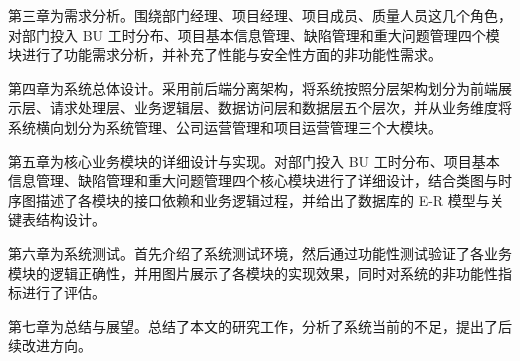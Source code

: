 第三章为需求分析。围绕部门经理、项目经理、项目成员、质量人员这几个角色，对部门投入 BU 工时分布、项目基本信息管理、缺陷管理和重大问题管理四个模块进行了功能需求分析，并补充了性能与安全性方面的非功能性需求。

第四章为系统总体设计。采用前后端分离架构，将系统按照分层架构划分为前端展示层、请求处理层、业务逻辑层、数据访问层和数据层五个层次，并从业务维度将系统横向划分为系统管理、公司运营管理和项目运营管理三个大模块。

第五章为核心业务模块的详细设计与实现。对部门投入 BU 工时分布、项目基本信息管理、缺陷管理和重大问题管理四个核心模块进行了详细设计，结合类图与时序图描述了各模块的接口依赖和业务逻辑过程，并给出了数据库的 E-R 模型与关键表结构设计。

第六章为系统测试。首先介绍了系统测试环境，然后通过功能性测试验证了各业务模块的逻辑正确性，并用图片展示了各模块的实现效果，同时对系统的非功能性指标进行了评估。

第七章为总结与展望。总结了本文的研究工作，分析了系统当前的不足，提出了后续改进方向。